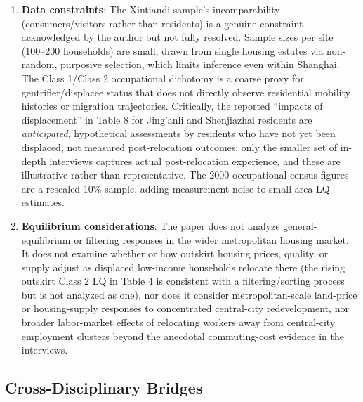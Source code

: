 \begin{enumerate}
  \item \textbf{Data constraints}: The Xintiandi sample's incomparability (consumers/visitors rather than residents) is a genuine constraint acknowledged by the author but not fully resolved. Sample sizes per site (100--200 households) are small, drawn from single housing estates via non-random, purposive selection, which limits inference even within Shanghai. The Class 1/Class 2 occupational dichotomy is a coarse proxy for gentrifier/displacee status that does not directly observe residential mobility histories or migration trajectories. Critically, the reported ``impacts of displacement'' in Table 8 for Jing'anli and Shenjiazhai residents are \emph{anticipated}, hypothetical assessments by residents who have not yet been displaced, not measured post-relocation outcomes; only the smaller set of in-depth interviews captures actual post-relocation experience, and these are illustrative rather than representative. The 2000 occupational census figures are a rescaled 10\% sample, adding measurement noise to small-area LQ estimates.
  \item \textbf{Equilibrium considerations}: The paper does not analyze general-equilibrium or filtering responses in the wider metropolitan housing market. It does not examine whether or how outskirt housing prices, quality, or supply adjust as displaced low-income households relocate there (the rising outskirt Class 2 LQ in Table 4 is consistent with a filtering/sorting process but is not analyzed as one), nor does it consider metropolitan-scale land-price or housing-supply responses to concentrated central-city redevelopment, nor broader labor-market effects of relocating workers away from central-city employment clusters beyond the anecdotal commuting-cost evidence in the interviews.
\end{enumerate}

\subsection*{Cross-Disciplinary Bridges}


